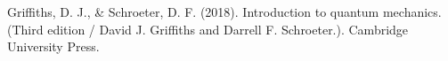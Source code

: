 \begin{thebibliography}{9}
Griffiths, D. J., \& Schroeter, D. F. (2018). Introduction to quantum mechanics. (Third edition / David J. Griffiths and Darrell F. Schroeter.). Cambridge University Press.

\end{thebibliography}
